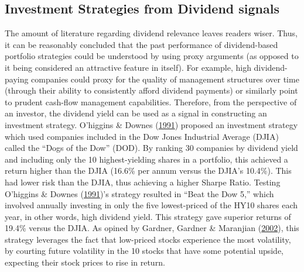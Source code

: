 \documentclass[11pt,preprint, authoryear]{elsarticle}
\numberwithin{equation}{section}
\numberwithin{figure}{section}
\numberwithin{table}{section}
\begin{document}
\hypertarget{investment-strategies-from-dividend-signals}{%
\subsection{Investment Strategies from Dividend
signals}\label{investment-strategies-from-dividend-signals}}

The amount of literature regarding dividend relevance leaves readers
wiser. Thus, it can be reasonably concluded that the past performance of
dividend-based portfolio strategies could be understood by using proxy
arguments (as opposed to it being considered an attractive feature in
itself). For example, high dividend-paying companies could proxy for the
quality of management structures over time (through their ability to
consistently afford dividend payments) or similarly point to prudent
cash-flow management capabilities. Therefore, from the perspective of an
investor, the dividend yield can be used as a signal in constructing an
investment strategy. O'higgins \& Downes
(\protect\hyperlink{ref-o1991beating}{1991}) proposed an investment
strategy which used companies included in the Dow Jones Industrial
Average (DJIA) called the ``Dogs of the Dow'' (DOD). By ranking 30
companies by dividend yield and including only the 10 highest-yielding
shares in a portfolio, this achieved a return higher than the DJIA
(16.6\% per annum versus the DJIA's 10.4\%). This had lower risk than
the DJIA, thus achieving a higher Sharpe Ratio. Testing O'higgins \&
Downes (\protect\hyperlink{ref-o1991beating}{1991})'s strategy resulted
in ``Beat the Dow 5,'' which involved annually investing in only the
five lowest-priced of the HY10 shares each year, in other words, high
dividend yield. This strategy gave superior returns of 19.4\% versus the
DJIA. As opined by Gardner, Gardner \& Maranjian
(\protect\hyperlink{ref-gardner2002motley}{2002}), this strategy
leverages the fact that low-priced stocks experience the most
volatility, by courting future volatility in the 10 stocks that have
some potential upside, expecting their stock prices to rise in return.
\end{document}
